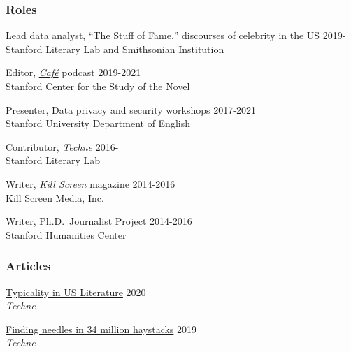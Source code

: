 \documentclass[
  12pt,
  letterpaper,
]{article}
\begin{document}
\hypertarget{roles}{%
\subsubsection{Roles}\label{roles}}

Lead data analyst, ``The Stuff of Fame,'' discourses of celebrity in the
US \hfill 2019-\\
\hspace*{0.333em} Stanford Literary Lab and Smithsonian Institution

Editor, \href{https://novel.stanford.edu/csn-cafe}{\emph{Café}} podcast
\hfill 2019-2021\\
\hspace*{0.333em} Stanford Center for the Study of the Novel

Presenter, Data privacy and security workshops \hfill 2017-2021\\
\hspace*{0.333em} Stanford University Department of English

Contributor, \href{https://litlab.stanford.edu/techne/}{\emph{Techne}}
\hfill 2016-\\
\hspace*{0.333em} Stanford Literary Lab

Writer, \href{https://web.archive.org/web/20221003115514/https://killscreen.com/previously/author/erik-fredner/}{\emph{Kill Screen}} magazine \hfill 2014-2016\\
\hspace*{0.333em} Kill Screen Media, Inc.

Writer, Ph.D.~Journalist Project \hfill 2014-2016\\
\hspace*{0.333em} Stanford Humanities Center

\hypertarget{articles}{%
\subsubsection{Articles}\label{articles}}

\href{https://web.archive.org/web/20220430165427/https://litlab.stanford.edu/typicality-in-the-u-s-novel/}{Typicality
in US Literature} \hfill 2020\\
\hspace*{0.333em} \emph{Techne}

\href{https://web.archive.org/web/20220430054802/https://litlab.stanford.edu/finding-needles-in-34-million-haystacks/}{Finding
needles in 34 million haystacks} \hfill 2019\\
\hspace*{0.333em} \emph{Techne}
\end{document}
